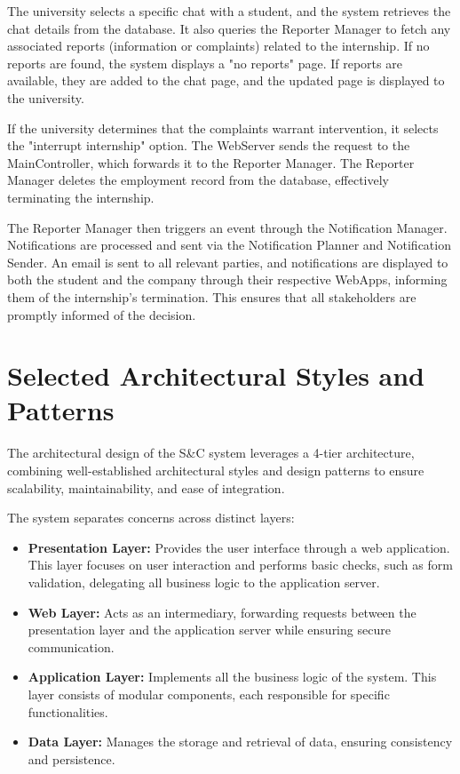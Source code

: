 The university selects a specific chat with a student, and the system retrieves the chat details from the database. It also queries the Reporter Manager to fetch any associated reports (information or complaints) related to the internship. If no reports are found, the system displays a "no reports" page. If reports are available, they are added to the chat page, and the updated page is displayed to the university.

If the university determines that the complaints warrant intervention, it selects the "interrupt internship" option. The WebServer sends the request to the MainController, which forwards it to the Reporter Manager. The Reporter Manager deletes the employment record from the database, effectively terminating the internship.

The Reporter Manager then triggers an event through the Notification Manager. Notifications are processed and sent via the Notification Planner and Notification Sender. An email is sent to all relevant parties, and notifications are displayed to both the student and the company through their respective WebApps, informing them of the internship's termination. This ensures that all stakeholders are promptly informed of the decision.









\newpage

\section{Selected Architectural Styles and Patterns}
\label{sec:sel_arch_styles_patterns}%

The architectural design of the S\&C system leverages a 4-tier architecture, combining well-established architectural styles and design patterns to ensure scalability, maintainability, and ease of integration.

The system separates concerns across distinct layers:

\begin{itemize}
    \item 
        \textbf{Presentation Layer:} Provides the user interface through a web application. This layer focuses on user interaction and performs basic checks, such as form validation, delegating all business logic to the application server.
    \item 
        \textbf{Web Layer:} Acts as an intermediary, forwarding requests between the presentation layer and the application server while ensuring secure communication.
    \item 
        \textbf{Application Layer:} Implements all the business logic of the system. This layer consists of modular components, each responsible for specific functionalities.
    \item 
        \textbf{Data Layer:} Manages the storage and retrieval of data, ensuring consistency and persistence.
\end{itemize}

